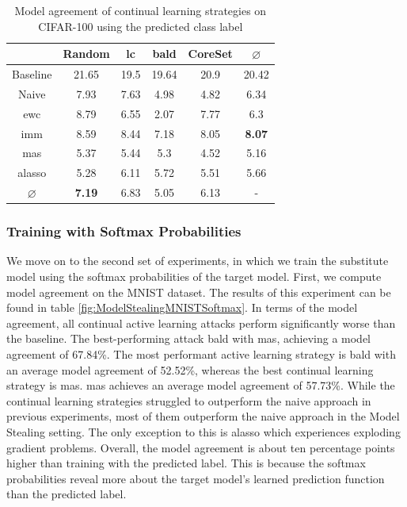 \begin{table}[h]
    \centering
    \begin{tabular}{ c | c c c c | c } 
         & Random & \gls{lc} & \gls{bald} & CoreSet & $\varnothing$\\ 
        \hline
        Baseline & 21.65 & 19.5 & 19.64 & 20.9 & 20.42\\
        \hline
        Naive & 7.93 & 7.63 & 4.98 & 4.82 & 6.34\\
        \gls{ewc} & 8.79 & 6.55 & 2.07 & 7.77 & 6.3\\
        \gls{imm} & 8.59 & 8.44 & 7.18 & 8.05 & \textbf{8.07}\\
        \gls{mas} & 5.37 & 5.44 & 5.3 & 4.52 & 5.16\\
        \gls{alasso} & 5.28 & 6.11 & 5.72 & 5.51 & 5.66\\
        \hline
        $\varnothing$ & \textbf{7.19} & 6.83 & 5.05 & 6.13 & -\\
    \end{tabular}
    \caption{Model agreement of continual learning strategies on CIFAR-100 using the predicted class label}
    \label{fig:ModelStealingCIFAR100Label}
\end{table}




\subsubsection{Training with Softmax Probabilities}
\label{sec:Evaluation:MS:Regularization:Softmax}

We move on to the second set of experiments, in which we train the substitute model using the softmax probabilities of the target model. First, we compute model agreement
on the MNIST dataset. The results of this experiment can be found in table \ref{fig:ModelStealingMNISTSoftmax}. In terms of the model agreement, all continual
active learning attacks perform significantly worse than the baseline. The best-performing attack \gls{bald} with \gls{mas}, achieving a model
agreement of 67.84\%. The most performant active learning strategy is \gls{bald} with an average model agreement of 52.52\%, whereas the best continual learning strategy is
\gls{mas}. \gls{mas} achieves an average model agreement of 57.73\%. While the continual learning strategies struggled to outperform the naive approach in previous experiments,
most of them outperform the naive approach in the Model Stealing setting. The only exception to this is \gls{alasso} which experiences exploding gradient problems. Overall,
the model agreement is about ten percentage points higher than training with the predicted label. This is because the softmax probabilities reveal more about the target model's
learned prediction function than the predicted label. \par 

